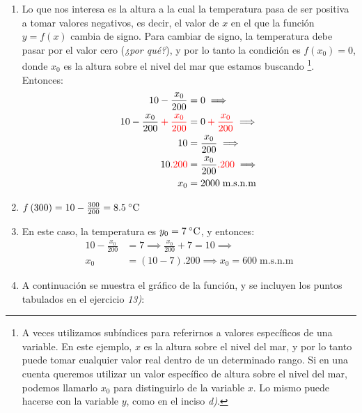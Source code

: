 \documentclass[12pt]{article}
\makeatletter
\newcommand{\grad}{\hspace{-2mm}$\phantom{a}^{\circ}$} %
\def\mcolor#1#{\@mcolor{#1}}
\def\@mcolor#1#2#3{\protect\leavevmode\color#1{#2}#3\color{black}}
\makeatother
\begin{document}
\begin{enumerate}
\begin{enumerate}
	\item Lo que nos interesa es la altura a la cual la temperatura pasa de ser positiva a tomar valores negativos, es decir, el valor de $x$ en el que la función $y = f\left(x\right)$ cambia de signo. Para cambiar de signo, la temperatura debe pasar por el valor cero (\textit{¿por qué?}), y por lo tanto la condición es $f\left(x_0\right) = 0$, donde $x_0$ es la altura sobre el nivel del mar que estamos buscando \footnote{A veces utilizamos subíndices para referirnos a valores específicos de una variable. En este ejemplo, $x$ es la altura sobre el nivel del mar, y por lo tanto puede tomar cualquier valor real dentro de un determinado rango. Si en una cuenta queremos utilizar un valor específico de altura sobre el nivel del mar, podemos llamarlo $x_0$ para distinguirlo de la variable $x$. Lo mismo puede hacerse con la variable $y$, como en el inciso \textit{d)}.}. Entonces:
	\begin{align*}
	  10 - \frac{x_0}{200} &= 0 \implies\\
      10 - \frac{x_0}{200} \mcolor{red}{+ \frac{x_0}{200}} &= 0 \mcolor{red}{+ \frac{x_0}{200}} \implies\\
      10 &= \frac{x_0}{200} \implies\\
      10\mcolor{red}{.200} &= \frac{x_0}{200}\mcolor{red}{.200} \implies\\
      x_0 &= 2000 \; \text{m.s.n.m}
	\end{align*}

	\item $f\left(300\right) = 10 - \frac{300}{200} = 8.5 \; \text{\grad C}$

	\item En este caso, la temperatura es $y_0 = 7\;\text{\grad C}$, y entonces:
	\begin{align*}
    10 - \frac{x_0}{200} &= 7 \implies \frac{x_0}{200} + 7 = 10 \implies\\
    x_0 &= (10 - 7).200 \implies x_0 = 600\; \text{m.s.n.m} 
   \end{align*}
	\item A continuación se muestra el gráfico de la función, y se incluyen los puntos tabulados en el ejercicio \textit{13)}:\par
	\begin{minipage}{\textwidth}
		
	\end{minipage}
	\bigskip
	
    \addtocounter{enumii}{1} %
	

\end{enumerate}
\end{enumerate}
\end{document}
